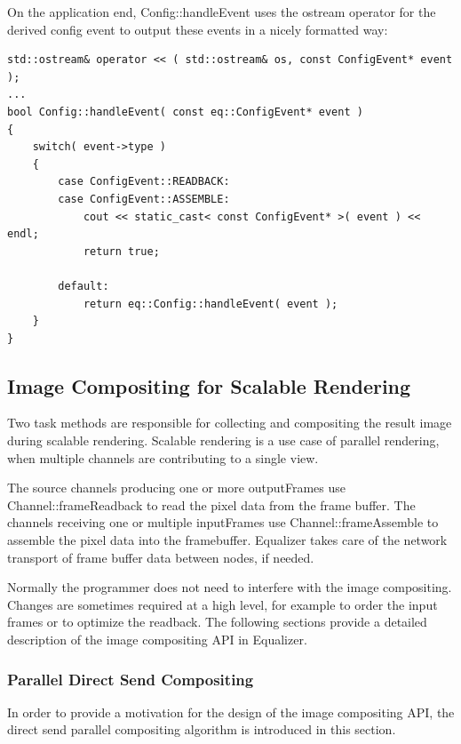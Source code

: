 \documentclass[10pt,a4]{scrartcl}
\begin{document}
On the application end, \textsf{Config::handleEvent} uses the
\textsf{ostream} operator for the derived config event to output these
events in a nicely formatted way:

{\footnotesize\begin{lstlisting}
std::ostream& operator << ( std::ostream& os, const ConfigEvent* event );
...
bool Config::handleEvent( const eq::ConfigEvent* event )
{
    switch( event->type )
    {
        case ConfigEvent::READBACK:
        case ConfigEvent::ASSEMBLE:
            cout << static_cast< const ConfigEvent* >( event ) << endl;
            return true;

        default:
            return eq::Config::handleEvent( event );
    }
}
\end{lstlisting}}%


\subsection{\label{sCompositing}Image Compositing for Scalable Rendering}

Two task methods are responsible for collecting and compositing the
result image during scalable rendering. Scalable rendering is a use case
of parallel rendering, when multiple channels are contributing to a single
view. 

The source channels producing one or more \textsf{outputFrame}s use
\textsf{Channel::frame\-Read\-back} to read the pixel data from the frame
buffer. The channels receiving one or multiple \textsf{inputFrame}s use
\textsf{Channel::frameAssemb\-le} to assemble the pixel data into the
framebuffer. Equalizer takes care of the network transport of frame
buffer data between nodes, if needed.

Normally the programmer does not need to interfere with the image
compositing. Changes are sometimes required at a high level, for example
to order the input frames or to optimize the readback. The following
sections provide a detailed description of the image compositing API in
Equalizer.

\subsubsection{Parallel Direct Send Compositing}

In order to provide a motivation for the design of the image compositing
API, the direct send parallel compositing algorithm is introduced in this
section.
\end{document}
